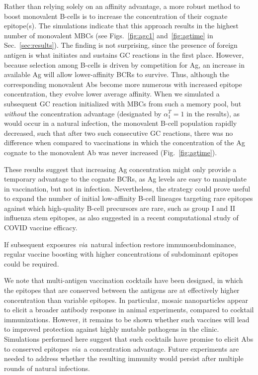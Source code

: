 \documentclass[utf8]{frontiersHLTH}%
\newcommand{\cred}[1]{\textsf{\color{red}#1}}
\def\via {{\it via}}
\newcommand{\fig}[1]{Fig.~\ref{fig:#1}}
\newcommand{\figs}[2]{Figs.~\ref{fig:#1} and~\ref{fig:#2}}
\newcommand{\Sec}[1]{Sec.~\ref{sec:#1}}
\renewcommand{\sec}[1]{\Sec{#1}}
\begin{document}
Rather than relying solely on an affinity advantage, a more robust method
to boost monovalent B-cells is to increase the concentration of their cognate
epitope(s). The simulations indicate that this approach results in the highest
number of monovalent MBCs (see \figs{agc1}{agtime} in \sec{results}).
The finding is not surprising, since the presence of foreign
antigen is what initiates and sustains GC reactions in the first place.
However, because selection among B-cells is driven by competition for Ag, an
increase in available Ag will allow lower-affinity BCRs to survive.
Thus, although the corresponding monovalent Abs become more numerous with increased epitope concentration,
they evolve lower average affinity.
When we simulated a subsequent
GC reaction initialized with MBCs from such a memory pool, but
\textit{without} the concentration advantage (designated by $\alpha_1^T=1$ in
the results), as would occur in a
natural infection, the monovalent B-cell population rapidly decreased,
such that after two such consecutive GC reactions, there was no difference
when compared to vaccinations in which the concentration of the Ag
cognate to the monovalent Ab was never increased (\fig{agtime}).

These results suggest
that increasing Ag concentration might only provide a temporary advantage
to the cognate BCRs, as Ag levels are easy to manipulate in
vaccination, but not in infection. \cred{Nevertheless, the strategy could prove
useful to expand the number of initial low-affinity B-cell lineages
targeting rare epitopes against which high-quality B-cell precursors are
rare, such as group I and II influenza stem epitopes, as also suggested 
in a recent computational study of COVID vaccine efficacy.\cite{garg21}}

If subsequent
exposures \via~natural infection restore immunosubdominance,\cite{ellebedy14} regular
vaccine boosting with higher concentrations of subdominant epitopes could be
required.


\cred{We note that multi-antigen vaccination cocktails have been designed, in
which the epitopes that are conserved between the antigens are at
effectively higher concentration than variable
epitopes.\cite{kanekiyo19,cohen21,glanville20} In particular, mosaic
nanoparticles appear to elicit a broader antibody response in animal
experiments, compared to cocktail immunizations.\cite{kanekiyo19,cohen21}
However, it remains to be shown whether such vaccines will lead to
improved protection against highly mutable pathogens in the clinic.}
%
Simulations performed here suggest that such cocktails have promise to
elicit Abs to conserved epitopes \via~a concentration advantage.  Future
experiments are needed to address whether the resulting immunity would
persist after multiple rounds of natural infections.
\end{document}
